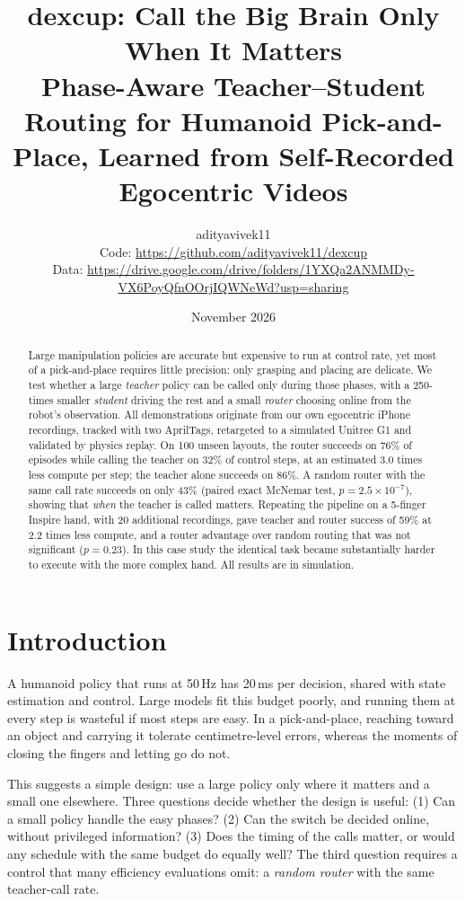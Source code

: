\documentclass[10pt,twocolumn]{article}
\title{\textbf{dexcup: Call the Big Brain Only When It Matters}\\[0.3em]
\large Phase-Aware Teacher--Student Routing for Humanoid Pick-and-Place, Learned from Self-Recorded Egocentric Videos}
\author{adityavivek11\\[0.3em]\small Code: \url{https://github.com/adityavivek11/dexcup}\\ \small Data: \url{https://drive.google.com/drive/folders/1YXQa2ANMMDy-VX6PoyQfnOOrjIQWNeWd?usp=sharing}}
\date{November 2026}
\begin{document}
\maketitle

\begin{abstract}
Large manipulation policies are accurate but expensive to run at control rate, yet most of a pick-and-place
requires little precision: only grasping and placing are delicate. We test whether a large \emph{teacher} policy
can be called only during those phases, with a 250-times smaller \emph{student} driving the rest and a small
\emph{router} choosing online from the robot's observation. All demonstrations originate from our own egocentric
iPhone recordings, tracked with two AprilTags, retargeted to a simulated Unitree G1 and validated by physics replay.
On 100 unseen layouts, the router succeeds on 76\% of episodes while calling the teacher on 32\% of control steps,
at an estimated 3.0 times less compute per step; the teacher alone succeeds on 86\%. A random router with the same
call rate succeeds on only 43\% (paired exact McNemar test, $p = 2.5\times10^{-7}$), showing that \emph{when} the
teacher is called matters. Repeating the pipeline on a 5-finger Inspire hand, with 20 additional recordings, gave
teacher and router success of 59\% at 2.2 times less compute, and a router advantage over random routing that was
not significant ($p = 0.23$). In this case study the identical task became substantially harder to execute with the
more complex hand. All results are in simulation.
\end{abstract}

\section{Introduction}
A humanoid policy that runs at 50\,Hz has 20\,ms per decision, shared with state estimation and control. Large
models fit this budget poorly, and running them at every step is wasteful if most steps are easy. In a
pick-and-place, reaching toward an object and carrying it tolerate centimetre-level errors, whereas the moments of
closing the fingers and letting go do not.

This suggests a simple design: use a large policy only where it matters and a small one elsewhere. Three questions
decide whether the design is useful: (1) Can a small policy handle the easy phases? (2) Can the switch be decided
online, without privileged information? (3) Does the timing of the calls matter, or would any schedule with the same
budget do equally well? The third question requires a control that many efficiency evaluations omit: a \emph{random
router} with the same teacher-call rate.
\end{document}
